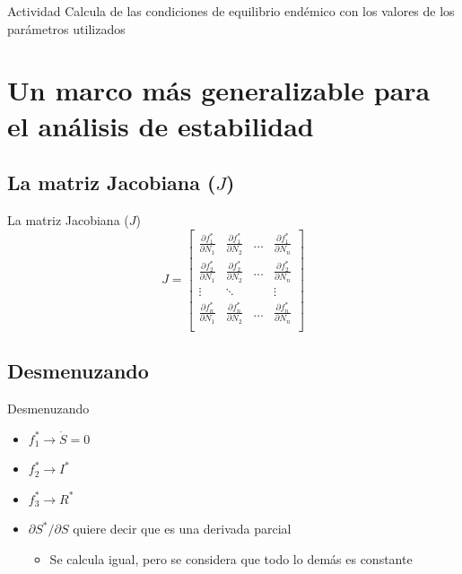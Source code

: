 \documentclass[
  11pt,
  ignorenonframetext,
]{beamer}
\providecommand{\tightlist}{%
  \setlength{\itemsep}{0pt}\setlength{\parskip}{0pt}}
\begin{document}
\begin{frame}{Actividad}
Calcula de las condiciones de equilibrio endémico con los valores de los
parámetros utilizados
\end{frame}

\hypertarget{un-marco-muxe1s-generalizable-para-el-anuxe1lisis-de-estabilidad}{%
\section{Un marco más generalizable para el análisis de
estabilidad}\label{un-marco-muxe1s-generalizable-para-el-anuxe1lisis-de-estabilidad}}

\hypertarget{la-matriz-jacobiana-j}{%
\subsection{\texorpdfstring{La matriz Jacobiana
(\(J\))}{La matriz Jacobiana (J)}}\label{la-matriz-jacobiana-j}}

\begin{frame}{La matriz Jacobiana (\(J\))}
\begin{equation}
J = \left[
\begin{matrix}
\frac{\partial f^*_1}{\partial N_1} & \frac{\partial f^*_1}{\partial N_2} & \dots & \frac{\partial f^*_1}{\partial N_n} \\

\frac{\partial f^*_2}{\partial N_1} & \frac{\partial f^*_2}{\partial N_2} & \dots & \frac{\partial f^*_2}{\partial N_n} \\

\vdots & \ddots & & \vdots \\

\frac{\partial f^*_n}{\partial N_1} & \frac{\partial f^*_n}{\partial N_2} & \dots & \frac{\partial f^*_n}{\partial N_n} \\
\end{matrix}
\right]
\end{equation}
\end{frame}

\hypertarget{desmenuzando}{%
\subsection{Desmenuzando}\label{desmenuzando}}

\begin{frame}{Desmenuzando}
\begin{itemize}
\item
  \(f^*_1 \rightarrow \dot{S} = 0\)
\item
  \(f^*_2 \rightarrow I^*\)
\item
  \(f^*_3 \rightarrow R^*\)
\item
  \(\partial S^* / \partial S\) quiere decir que es una derivada parcial

  \begin{itemize}
  \tightlist
  \item
    Se calcula igual, pero se considera que todo lo demás es constante
  \end{itemize}
\end{itemize}
\end{frame}
\end{document}

